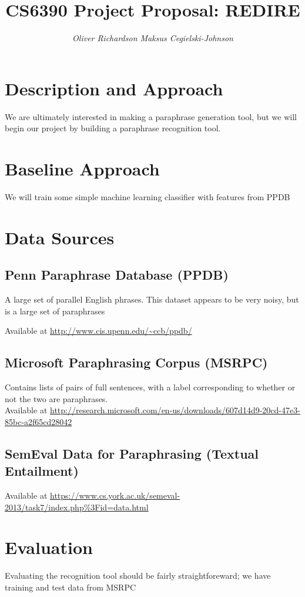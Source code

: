 \documentclass[11pt, reqno]{amsart}
\begin{document}
	\title{\LARGE CS6390 Project Proposal: REDIRE}
	\author{\it Oliver Richardson \hspace{2em} Maksus Cegielski-Johnson }
	\maketitle 
	
	\vspace{-2em}
	
	\section{Description and Approach}
	We are ultimately interested in making a paraphrase generation tool, but we will begin our project by building a paraphrase recognition tool. 
	
	\section{Baseline Approach}
	We will train some simple machine learning classifier with features from PPDB 
	
	\section{Data Sources}
	\subsection{ Penn Paraphrase Database (PPDB)} 
	A large set of parallel English phrases. This dataset appears to be very noisy, but is a large set of paraphrases
	
	Available at \url{http://www.cis.upenn.edu/~ccb/ppdb/} 
		
	\subsection{Microsoft Paraphrasing Corpus (MSRPC) }
	Contains lists of pairs of full sentences, with a label corresponding to whether or not the two are paraphrases.\\
	Available at \url{http://research.microsoft.com/en-us/downloads/607d14d9-20cd-47e3-85bc-a2f65cd28042} 
	
	\subsection{SemEval Data for Paraphrasing (Textual Entailment) }
	
	Available at \url{https://www.cs.york.ac.uk/semeval-2013/task7/index.php%3Fid=data.html}
	\subsection{}
		
	\section{Evaluation}
	Evaluating the recognition tool should be fairly straightforeward; we have training and test data from MSRPC
	
\end{document}
